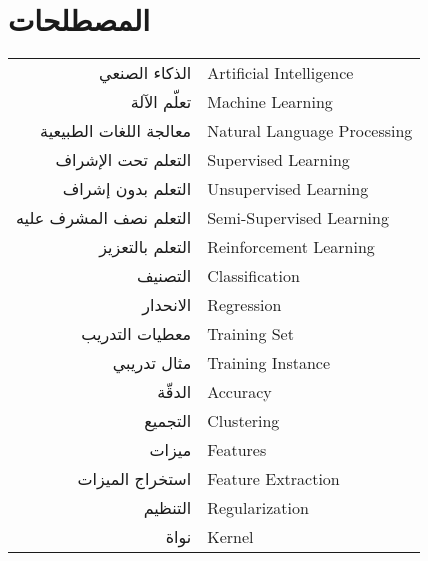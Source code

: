 

\chapter*{المصطلحات}

\begin{doublespacing}
	\begin{center}
		\begin{tabular}{r l}
			
			\indent
			الذكاء الصنعي 			&		 	\textenglish{Artificial Intelligence}			\\
			
			\indent
			تعلّم الآلة	 			& 			\textenglish{Machine Learning}			\\
			
			\indent
			معالجة اللغات الطبيعية		& 			\textenglish{Natural Language Processing}	\\
			
			\indent
			التعلم تحت الإشراف		& 			\textenglish{Supervised Learning}	\\
			
			\indent
			التعلم بدون إشراف		& 			\textenglish{Unsupervised Learning}	\\
			
			\indent
			التعلم نصف المشرف عليه		& 			\textenglish{Semi-Supervised Learning}	\\
			
			\indent
			التعلم بالتعزيز		& 			\textenglish{Reinforcement Learning}	\\
			
			\indent
			التصنيف		& 			\textenglish{Classification}	\\
			
			\indent
			الانحدار		& 			\textenglish{Regression}	\\
			
			\indent
			معطيات التدريب		& 			\textenglish{Training Set}	\\
			
			\indent
			مثال تدريبي		& 			\textenglish{Training Instance}	\\
			
			\indent
			الدقّة			& 			\textenglish{Accuracy}				\\
			
			\indent
			التجميع		& 			\textenglish{Clustering}				\\
			
			\indent
			ميزات			& 				\textenglish{Features}				\\
			
			\indent
			استخراج الميزات		& 				\textenglish{Feature Extraction}				\\
			
			\indent
			التنظيم		& 			\textenglish{Regularization}	\\
			
			\indent
			نواة		& 			\textenglish{Kernel}	\\
			
		\end{tabular}
	\end{center}
\end{doublespacing}

